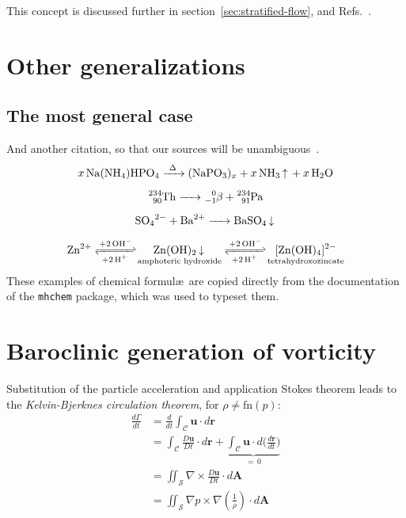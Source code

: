 \lipsum[11-12] This concept is discussed further in section~\ref{sec:stratified-flow}, and Refs.~\cite{euler1740,fourier1822}.


\section{Other generalizations}

\subsection{The most general case}

\lipsum[7] And another citation, so that our sources will be unambiguous~\cite{montijano2014}.
\begin{gather}
\ce{x Na(NH4)HPO4 ->[\Delta] (NaPO3)_x + x NH3 ^ + x H2O} \\[0.5em]
\ce{^234_90Th -> ^0_-1$\beta${} + ^234_91Pa} \\[0.5em]
\ce{SO4^2- + Ba^2+ -> BaSO4 v} \\[0.5em]
\ce{Zn^2+
<=>[+ 2OH-][+ 2H+]
$\underset{\textrm{amphoteric hydroxide}}{\ce{Zn(OH)2 v}}$
<=>[+ 2OH-][+ 2H+]
$\underset{\textrm{tetrahydroxozincate}}{\ce{[Zn(OH)4]^2-}}$
}
\end{gather}
These examples of chemical formul\ae\ are copied directly from the documentation of the \texttt{mhchem} package, which was used to typeset them.

\section{Baroclinic generation of vorticity\label{sec:stratified-flow}}

Substitution of the particle acceleration and application Stokes theorem leads to the \textit{Kelvin-Bjerknes circulation theorem}, for
$\rho \neq \textrm{fn}(p)$:
\begin{align}
\frac{d\Gamma}{dt} &{}= \frac{d}{dt} \int_{\mathcal{C}} \mathbf{u} \cdot d\mathbf{r}\\
				   &{}= \int_{\mathcal{C}} \frac{D\mathbf{u}}{Dt} \cdot d\mathbf{r} + \underbrace{\int_{\mathcal{C}} \mathbf{u}\cdot d\biggl( \frac{d\mathbf{r}}{dt}\biggr)}_{=\, 0} \\[-2pt]
                   &{}= \iint_{\mathcal{S}} \nabla \times \frac{D\mathbf{u}}{Dt}  \cdot d\mathbf{A}\\
                   &{}= \iint_{\mathcal{S}}  \nabla p \times \nabla \left( \frac{1}{\rho}\right) \cdot d\mathbf{A}
\end{align}

